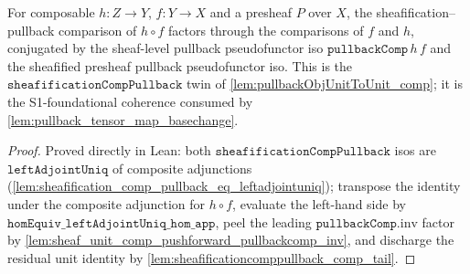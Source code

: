 \begin{lemma}
  \label{lem:sheafificationcomppullback_comp}
  For composable \(h : Z \to Y\), \(f : Y \to X\) and a presheaf \(P\) over \(X\), the
  sheafification--pullback comparison of \(h \circ f\) factors through the comparisons of
  \(f\) and \(h\), conjugated by the sheaf-level pullback pseudofunctor iso
  \(\mathtt{pullbackComp}\,h\,f\) and the sheafified presheaf pullback pseudofunctor iso.
  This is the \(\mathtt{sheafificationCompPullback}\) twin of \cref{lem:pullbackObjUnitToUnit_comp};
  it is the S1-foundational coherence consumed by \cref{lem:pullback_tensor_map_basechange}.
\end{lemma}
\begin{proof}
  \leanok
  Proved directly in Lean: both \(\mathtt{sheafificationCompPullback}\) isos are
  \(\mathtt{leftAdjointUniq}\) of composite adjunctions
  (\cref{lem:sheafification_comp_pullback_eq_leftadjointuniq}); transpose the identity under
  the composite adjunction for \(h \circ f\), evaluate the left-hand side by
  \(\mathtt{homEquiv\_leftAdjointUniq\_hom\_app}\), peel the leading
  \(\mathtt{pullbackComp}.\mathrm{inv}\) factor by
  \cref{lem:sheaf_unit_comp_pushforward_pullbackcomp_inv}, and discharge the residual unit
  identity by \cref{lem:sheafificationcomppullback_comp_tail}.
\end{proof}

